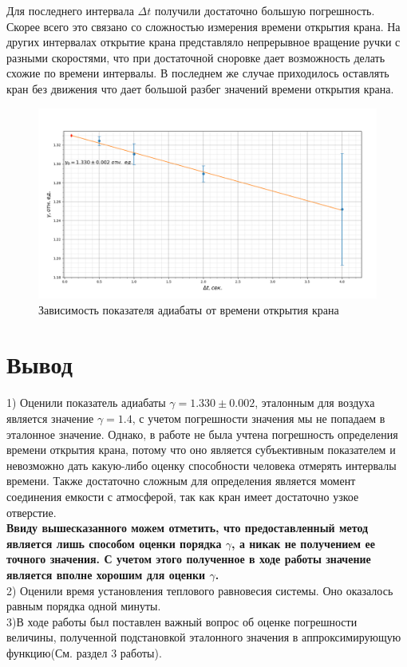 \documentclass[a4paper, 12pt]{article}%
\begin{document}
	Для последнего интервала $\Delta t$ получили достаточно большую погрешность. Скорее всего это связано со сложностью измерения времени открытия крана. На других интервалах открытие крана представляло непрерывное вращение ручки с разными скоростями, что при достаточной сноровке дает возможность делать схожие по времени интервалы. В последнем же случае приходилось оставлять кран без движения что дает большой разбег значений времени открытия крана.
	\newpage
	\begin{figure}[H]
		\centering
		\includegraphics[width=0.95\linewidth]{gamma}
		\caption{Зависимость показателя адиабаты от времени открытия крана}
		\label{fig:gamma}
	\end{figure}
	\section{Вывод}
	1) Оценили показатель адиабаты $\gamma=1.330\pm 0.002$, эталонным для воздуха является значение $\gamma=1.4$, с учетом погрешности значения мы не попадаем в эталонное значение. Однако, в работе не была учтена погрешность определения времени открытия крана, потому что оно является субъективным показателем и невозможно дать какую-либо оценку способности человека отмерять интервалы времени. Также достаточно сложным для определения является момент соединения емкости с атмосферой, так как кран имеет достаточно узкое отверстие.\\
	\textbf{Ввиду вышесказанного можем отметить, что предоставленный метод является лишь способом оценки порядка $\gamma$, а никак не получением ее точного значения. С учетом этого полученное в ходе работы значение является вполне хорошим для оценки $\gamma$.}\\
	2) Оценили время установления теплового равновесия системы. Оно оказалось равным порядка одной минуты.\\
	3)В ходе работы был поставлен важный вопрос об оценке погрешности величины, полученной подстановкой эталонного значения в аппроксимирующую функцию(См. раздел 3 работы).\\ 
\end{document}
